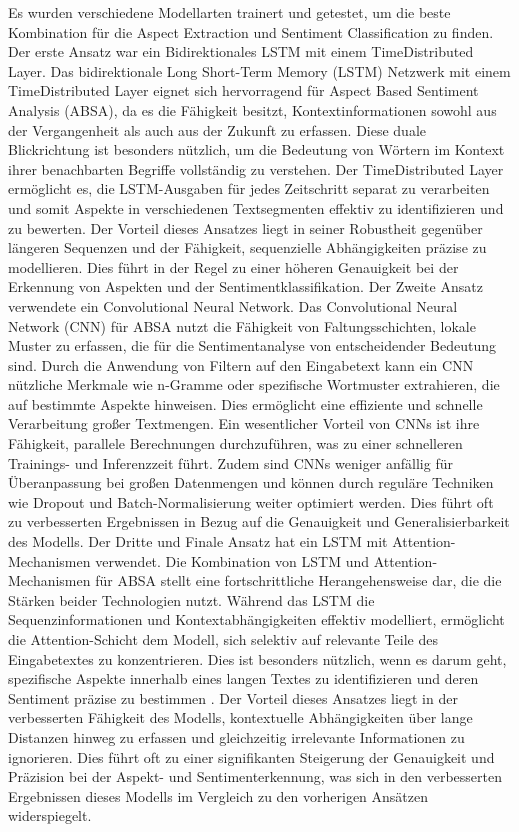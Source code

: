 \documentclass[12pt]{article}
\begin{document}
Es wurden verschiedene Modellarten trainert und getestet, um die beste Kombination für die Aspect Extraction und Sentiment Classification zu finden.
\newline
\newline
Der erste Ansatz war ein Bidirektionales LSTM mit einem TimeDistributed Layer.
Das bidirektionale Long Short-Term Memory (LSTM) Netzwerk mit einem TimeDistributed Layer eignet sich hervorragend für Aspect Based Sentiment Analysis (ABSA), da es die Fähigkeit besitzt, Kontextinformationen sowohl aus der Vergangenheit als auch aus der Zukunft zu erfassen. Diese duale Blickrichtung ist besonders nützlich, um die Bedeutung von Wörtern im Kontext ihrer benachbarten Begriffe vollständig zu verstehen. Der TimeDistributed Layer ermöglicht es, die LSTM-Ausgaben für jedes Zeitschritt separat zu verarbeiten und somit Aspekte in verschiedenen Textsegmenten effektiv zu identifizieren und zu bewerten. Der Vorteil dieses Ansatzes liegt in seiner Robustheit gegenüber längeren Sequenzen und der Fähigkeit, sequenzielle Abhängigkeiten präzise zu modellieren. Dies führt in der Regel zu einer höheren Genauigkeit bei der Erkennung von Aspekten und der Sentimentklassifikation.
\newline
\newline
Der Zweite Ansatz verwendete ein Convolutional Neural Network.
Das Convolutional Neural Network (CNN) für ABSA nutzt die Fähigkeit von Faltungsschichten, lokale Muster zu erfassen, die für die Sentimentanalyse von entscheidender Bedeutung sind. Durch die Anwendung von Filtern auf den Eingabetext kann ein CNN nützliche Merkmale wie n-Gramme oder spezifische Wortmuster extrahieren, die auf bestimmte Aspekte hinweisen. Dies ermöglicht eine effiziente und schnelle Verarbeitung großer Textmengen. Ein wesentlicher Vorteil von CNNs ist ihre Fähigkeit, parallele Berechnungen durchzuführen, was zu einer schnelleren Trainings- und Inferenzzeit führt. Zudem sind CNNs weniger anfällig für Überanpassung bei großen Datenmengen und können durch reguläre Techniken wie Dropout und Batch-Normalisierung weiter optimiert werden. Dies führt oft zu verbesserten Ergebnissen in Bezug auf die Genauigkeit und Generalisierbarkeit des Modells.
\newline
\newline
Der Dritte und Finale Ansatz hat ein LSTM mit Attention-Mechanismen verwendet.
Die Kombination von LSTM und Attention-Mechanismen für ABSA stellt eine fortschrittliche Herangehensweise dar, die die Stärken beider Technologien nutzt. Während das LSTM die Sequenzinformationen und Kontextabhängigkeiten effektiv modelliert, ermöglicht die Attention-Schicht dem Modell, sich selektiv auf relevante Teile des Eingabetextes zu konzentrieren. Dies ist besonders nützlich, wenn es darum geht, spezifische Aspekte innerhalb eines langen Textes zu identifizieren und deren Sentiment präzise zu bestimmen \cite{vaswani2017attention}. Der Vorteil dieses Ansatzes liegt in der verbesserten Fähigkeit des Modells, kontextuelle Abhängigkeiten über lange Distanzen hinweg zu erfassen und gleichzeitig irrelevante Informationen zu ignorieren. Dies führt oft zu einer signifikanten Steigerung der Genauigkeit und Präzision bei der Aspekt- und Sentimenterkennung, was sich in den verbesserten Ergebnissen dieses Modells im Vergleich zu den vorherigen Ansätzen widerspiegelt.
\end{document}
